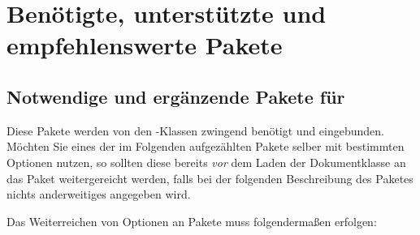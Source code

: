 \chapter{%
  Benötigte, unterstützte und empfehlenswerte Pakete%
  \label{sec:packages}%
}
\section{%
  Notwendige und ergänzende Pakete für \TUDScript%
  \label{sec:packages:needed}%
}

Diese Pakete werden von den \TUDScript-Klassen zwingend benötigt und 
eingebunden. Möchten Sie eines der im Folgenden aufgezählten Pakete selber 
mit bestimmten Optionen nutzen, so sollten diese bereits \emph{vor} dem Laden 
der Dokumentklasse an das Paket weitergereicht werden, falls bei der folgenden
Beschreibung des Paketes nichts anderweitiges angegeben wird.
%
\begin{Example}
Das Weiterreichen von Optionen an Pakete muss folgendermaßen erfolgen:
\end{Example}
%
